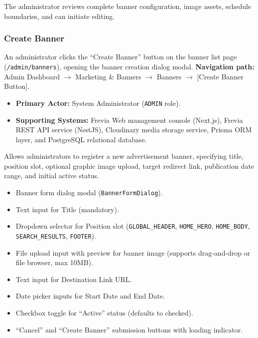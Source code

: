 \noindent The administrator reviews complete banner configuration, image assets, schedule boundaries, and can initiate editing.

\subsubsection{ Create Banner}

An administrator clicks the ``Create Banner'' button on the banner list page (\texttt{/admin/banners}), opening the banner creation dialog modal.\newline
\textbf{Navigation path:} Admin Dashboard $\rightarrow$ Marketing \& Banners $\rightarrow$ Banners $\rightarrow$ [Create Banner Button].


\begin{itemize}[leftmargin=1.6em,topsep=3pt,itemsep=2pt,parsep=0pt,label=$\bullet$]
    \item \textbf{Primary Actor:} System Administrator (\texttt{ADMIN} role).
    \item \textbf{Supporting Systems:} Frevia Web management console (Next.js), Frevia REST API service (NestJS), Cloudinary media storage service, Prisma ORM layer, and PostgreSQL relational database.
\end{itemize}

\noindent Allows administrators to register a new advertisement banner, specifying title, position slot, optional graphic image upload, target redirect link, publication date range, and initial active status.

\begin{itemize}[leftmargin=1.6em,topsep=3pt,itemsep=2pt,parsep=0pt,label=$\bullet$]
    \item Banner form dialog modal (\texttt{BannerFormDialog}).
    \item Text input for Title (mandatory).
    \item Dropdown selector for Position slot (\texttt{GLOBAL\_HEADER}, \texttt{HOME\_HERO}, \texttt{HOME\_BODY}, \texttt{SEARCH\_RESULTS}, \texttt{FOOTER}).
    \item File upload input with preview for banner image (supports drag-and-drop or file browser, max 10MB).
    \item Text input for Destination Link URL.
    \item Date picker inputs for Start Date and End Date.
    \item Checkbox toggle for ``Active'' status (defaults to checked).
    \item ``Cancel'' and ``Create Banner'' submission buttons with loading indicator.
\end{itemize}

